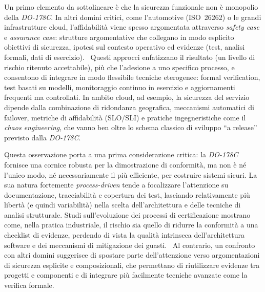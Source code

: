 \documentclass[italian, Lau, oneside]{sapthesis} %
\begin{document}
Un primo elemento da sottolineare è che la sicurezza funzionale non è monopolio della \textit{DO-178C}. In altri domini critici, come l’automotive (ISO~26262) o le grandi infrastrutture cloud, l’affidabilità viene spesso argomentata attraverso \textit{safety case} e \textit{assurance case}: strutture argomentative che collegano in modo esplicito obiettivi di sicurezza, ipotesi sul contesto operativo ed evidenze (test, analisi formali, dati di esercizio).~\cite{ref:rushby2016assurance,ref:kanwal2023contract,ref:palin2011iso26262} Questi approcci enfatizzano il risultato (un livello di rischio ritenuto accettabile), più che l’adesione a uno specifico processo, e consentono di integrare in modo flessibile tecniche eterogenee: formal verification, test basati su modelli, monitoraggio continuo in esercizio e aggiornamenti frequenti ma controllati. In ambito cloud, ad esempio, la sicurezza del servizio dipende dalla combinazione di ridondanza geografica, meccanismi automatici di failover, metriche di affidabilità (SLO/SLI) e pratiche ingegneristiche come il \textit{chaos engineering}, che vanno ben oltre lo schema classico di sviluppo “a release” previsto dalla \textit{DO-178C}.

Questa osservazione porta a una prima considerazione critica: la \textit{DO-178C} fornisce una cornice robusta per la dimostrazione di conformità, ma non è né l’unico modo, né necessariamente il più efficiente, per costruire sistemi sicuri. La sua natura fortemente \textit{process-driven} tende a focalizzare l’attenzione su documentazione, tracciabilità e copertura dei test, lasciando relativamente più libertà (e quindi variabilità) nella scelta dell’architettura e delle tecniche di analisi strutturale. Studi sull’evoluzione dei processi di certificazione mostrano come, nella pratica industriale, il rischio sia quello di ridurre la conformità a una checklist di evidenze, perdendo di vista la qualità intrinseca dell’architettura software e dei meccanismi di mitigazione dei guasti.~\cite{ref:youn2015,ref:hilderman2023} Al contrario, un confronto con altri domini suggerisce di spostare parte dell’attenzione verso argomentazioni di sicurezza esplicite e composizionali, che permettano di riutilizzare evidenze tra progetti e componenti e di integrare più facilmente tecniche avanzate come la verifica formale.
\end{document}
